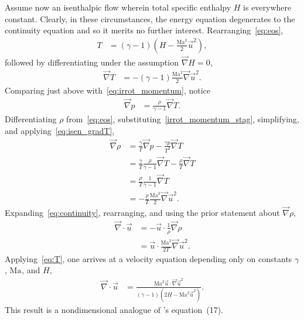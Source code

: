 \documentclass[letterpaper,11pt,nointlimits,reqno]{amsart}
\newcommand{\Mach}[1][]{\mbox{Ma}_{#1}}
\begin{document}
Assume now an isenthalpic flow wherein total specific enthalpy $H$ is
everywhere constant. Clearly, in these circumstances, the energy equation
degenerates to the continuity equation and so it merits no further interest.
Rearranging~\eqref{eq:eos},
\begin{align}
  T &= \left(\gamma-1\right)\left(H - \frac{\Mach^2}{2}\vec{u}^2\right),
  \label{eq:T}
\end{align}
followed by differentiating under the assumption $\vec{\nabla}H=0$,
\begin{align}
  \vec{\nabla} T &= -\left(\gamma-1\right)\frac{\Mach^2}{2}\vec{\nabla}\vec{u}^2.
  \label{eq:isen_gradT}
\end{align}
Comparing just above with~\eqref{eq:irrot_momentum}, notice
\begin{align}
  \vec{\nabla}p &= \frac{\rho}{\gamma-1}\vec{\nabla}T.
  \label{irrot_momentum_stag}
\end{align}
Differentiating $\rho$ from~\eqref{eq:eos},
substituting~\eqref{irrot_momentum_stag}, simplifying,
and applying~\eqref{eq:isen_gradT},
\begin{align}
  \vec{\nabla}\rho
  &=
  \frac{\gamma}{T} \vec{\nabla}p
  -
  \frac{\gamma p}{T^2} \vec{\nabla}T
\\&=
  \frac{\gamma}{T} \frac{\rho}{\gamma-1} \vec{\nabla}T
  -
  \frac{\rho}{T} \vec{\nabla}T
\\&=
  \frac{\rho}{T}
  \frac{1}{\gamma-1}
  \vec{\nabla}T
\\&=
  -
  \frac{\rho}{T}
  \frac{\Mach^2}{2}\vec{\nabla}\vec{u}^2.
  \label{eq:rho}
\end{align}
Expanding~\eqref{eq:continuity}, rearranging, and using the prior statement
about $\vec{\nabla}\rho$,
\begin{align}
  \vec{\nabla}\cdot\vec{u}
  &= -\vec{u}\cdot\frac{1}{\rho}\vec{\nabla}\rho
\\
  &= \vec{u}\cdot \frac{\Mach^2}{2T}\vec{\nabla}\vec{u}^2.
\end{align}
Applying~\eqref{eq:T}, one arrives at a velocity equation depending
only on constants $\gamma$, $\Mach$, and $H$,
\begin{align}
  \vec{\nabla}\cdot\vec{u}
  &= \frac{\Mach^2 \vec{u}\cdot \vec{\nabla}\vec{u}^2}
          {\left(\gamma-1\right)\left(2H - \Mach^2 \vec{u}^2\right)}.
  \label{eq:gibbsresult}
\end{align}
This result is a nondimensional analogue of \citeauthor{Saad2011Coordinate}'s
equation~(17).
\end{document}
